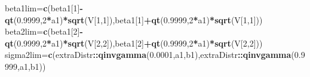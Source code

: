 \documentclass[
]{book}
\newenvironment{Shaded}{\begin{snugshade}}{\end{snugshade}}
\newcommand{\DecValTok}[1]{\textcolor[rgb]{0.00,0.00,0.81}{#1}}
\newcommand{\FloatTok}[1]{\textcolor[rgb]{0.00,0.00,0.81}{#1}}
\newcommand{\KeywordTok}[1]{\textcolor[rgb]{0.13,0.29,0.53}{\textbf{#1}}}
\newcommand{\NormalTok}[1]{#1}
\newcommand{\OperatorTok}[1]{\textcolor[rgb]{0.81,0.36,0.00}{\textbf{#1}}}
\begin{document}
\begin{Shaded}
\begin{Highlighting}[]
{{{{{\NormalTok{beta1lim=}\KeywordTok{c}\NormalTok{(beta1[}\DecValTok{1}\NormalTok{]}\OperatorTok{-}\KeywordTok{qt}\NormalTok{(}\FloatTok{0.9999}\NormalTok{,}\DecValTok{2}\OperatorTok{*}\NormalTok{a1)}\OperatorTok{*}\KeywordTok{sqrt}\NormalTok{(V[}\DecValTok{1}\NormalTok{,}\DecValTok{1}\NormalTok{]),beta1[}\DecValTok{1}\NormalTok{]}\OperatorTok{+}\KeywordTok{qt}\NormalTok{(}\FloatTok{0.9999}\NormalTok{,}\DecValTok{2}\OperatorTok{*}\NormalTok{a1)}\OperatorTok{*}\KeywordTok{sqrt}\NormalTok{(V[}\DecValTok{1}\NormalTok{,}\DecValTok{1}\NormalTok{]))}
\NormalTok{beta2lim=}\KeywordTok{c}\NormalTok{(beta1[}\DecValTok{2}\NormalTok{]}\OperatorTok{-}\KeywordTok{qt}\NormalTok{(}\FloatTok{0.9999}\NormalTok{,}\DecValTok{2}\OperatorTok{*}\NormalTok{a1)}\OperatorTok{*}\KeywordTok{sqrt}\NormalTok{(V[}\DecValTok{2}\NormalTok{,}\DecValTok{2}\NormalTok{]),beta1[}\DecValTok{2}\NormalTok{]}\OperatorTok{+}\KeywordTok{qt}\NormalTok{(}\FloatTok{0.9999}\NormalTok{,}\DecValTok{2}\OperatorTok{*}\NormalTok{a1)}\OperatorTok{*}\KeywordTok{sqrt}\NormalTok{(V[}\DecValTok{2}\NormalTok{,}\DecValTok{2}\NormalTok{]))}
\NormalTok{sigma2lim=}\KeywordTok{c}\NormalTok{(extraDistr}\OperatorTok{::}\KeywordTok{qinvgamma}\NormalTok{(}\FloatTok{0.0001}\NormalTok{,a1,b1),extraDistr}\OperatorTok{::}\KeywordTok{qinvgamma}\NormalTok{(}\FloatTok{0.9999}\NormalTok{,a1,b1))}

}}}}}
\end{Highlighting}
\end{Shaded}
\end{document}
